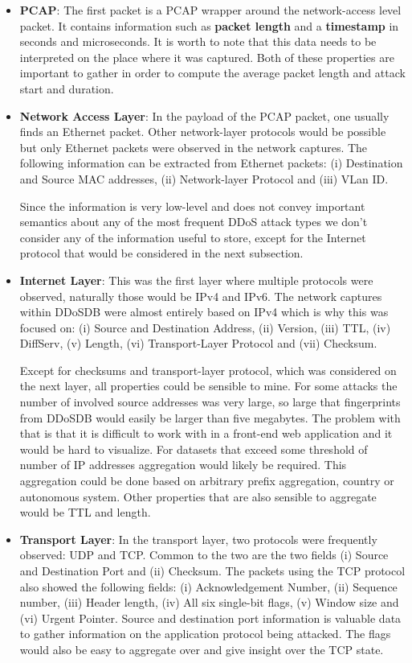 \begin{itemize}
\item \textbf{PCAP}:
The first packet is a PCAP wrapper around the network-access level packet. It contains information such as \textbf{packet length} and a \textbf{timestamp} in seconds and microseconds. It is worth to note that this data needs to be interpreted on the place where it was captured.
Both of these properties are important to gather in order to compute the average packet length and attack start and duration.

\item \textbf{Network Access Layer}: 
In the payload of the PCAP packet, one usually finds an Ethernet packet. Other network-layer protocols would be possible but only Ethernet packets were observed in the network captures.
The following information can be extracted from Ethernet packets:
(i) Destination and Source MAC addresses, (ii) Network-layer Protocol and (iii) VLan ID.

Since the information is very low-level and does not convey important semantics about any of the most frequent DDoS attack types we don't consider any of the information useful to store, except for the Internet protocol that would be considered in the next subsection.


\item \textbf{Internet Layer}: 
This was the first layer where multiple protocols were observed, naturally those would be IPv4 and IPv6. The network captures within DDoSDB were almost entirely based on IPv4 which is why this was focused on:
(i) Source and Destination Address, (ii) Version, (iii) TTL, (iv) DiffServ, (v) Length, (vi) Transport-Layer Protocol and (vii) Checksum.

Except for checksums and transport-layer protocol, which was considered on the next layer, all properties could be sensible to mine.
For some attacks the number of involved source addresses was very large, so large that fingerprints from DDoSDB would easily be larger than five megabytes. The problem with that is that it is difficult to work with in a front-end web application and it would be hard to visualize. For datasets that exceed some threshold of number of IP addresses aggregation would likely be required. This aggregation could be done based on arbitrary prefix aggregation, country or autonomous system.
Other properties that are also sensible to aggregate would be TTL and length.

\item \textbf{Transport Layer}: 
In the transport layer, two protocols were frequently observed: UDP and TCP.
Common to the two are the two fields (i) Source and Destination Port and (ii) Checksum.
The packets using the TCP protocol also showed the following fields: (i) Acknowledgement Number, (ii) Sequence number, (iii) Header length, (iv) All six single-bit flags, (v) Window size and (vi) Urgent Pointer.
Source and destination port information is valuable data to gather information on the application protocol being attacked. The flags would also be easy to aggregate over and give insight over the TCP state.

\end{itemize}


